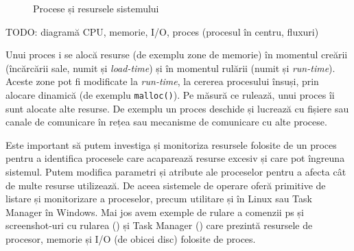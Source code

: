 \begin{figure}[!htbp]
	\centering
        \def\svgwidth{0.8\textwidth}
        
        \caption{Procese și resursele sistemului}
        \label{fig:process-resources}
\end{figure}
TODO: diagramă CPU, memorie, I/O, proces (procesul în centru, fluxuri)

Unui proces i se alocă resurse (de exemplu zone de memorie) în momentul creării
(încărcării sale, numit și \textit{load-time}) și în momentul rulării (numit și
\textit{run-time}). Aceste zone pot fi modificate la \textit{run-time}, la cererea procesului
însuși, prin alocare dinamică (de exemplu \texttt{malloc()}). Pe măsură ce rulează, unui
proces îi sunt alocate alte resurse. De exemplu un proces deschide și lucrează
cu fișiere sau canale de comunicare în rețea sau mecanisme de comunicare cu alte
procese.

Este important să putem investiga și monitoriza resursele folosite de un proces
pentru a identifica procesele care acaparează resurse excesiv și care pot
îngreuna sistemul. Putem modifica parametri și atribute ale proceselor pentru a
afecta cât de multe resurse utilizează. De aceea sistemele de operare oferă
primitive de listare și monitorizare a proceselor, precum utilitare  și  în
Linux sau Task Manager în Windows. Mai jos avem exemple de rulare a comenzii ps
și screenshot-uri cu rularea  () și Task Manager
() care prezintă resursele de procesor, memorie și
I/O (de obicei disc) folosite de proces.


